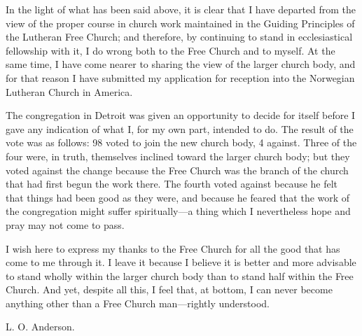 In the light of what has been said above, it is clear that I have departed from the view of the proper course in church work maintained in the Guiding Principles of the Lutheran Free Church; and therefore, by continuing to stand in ecclesiastical fellowship with it, I do wrong both to the Free Church and to myself. At the same time, I have come nearer to sharing the view of the larger church body, and for that reason I have submitted my application for reception into the Norwegian Lutheran Church in America.

The congregation in Detroit was given an opportunity to decide for itself before I gave any indication of what I, for my own part, intended to do. The result of the vote was as follows: 98 voted to join the new church body, 4 against. Three of the four were, in truth, themselves inclined toward the larger church body; but they voted against the change because the Free Church was the branch of the church that had first begun the work there. The fourth voted against because he felt that things had been good as they were, and because he feared that the work of the congregation might suffer spiritually—a thing which I nevertheless hope and pray may not come to pass.

I wish here to express my thanks to the Free Church for all the good that has come to me through it. I leave it because I believe it is better and more advisable to stand wholly within the larger church body than to stand half within the Free Church. And yet, despite all this, I feel that, at bottom, I can never become anything other than a Free Church man—rightly understood.

L. O. Anderson.